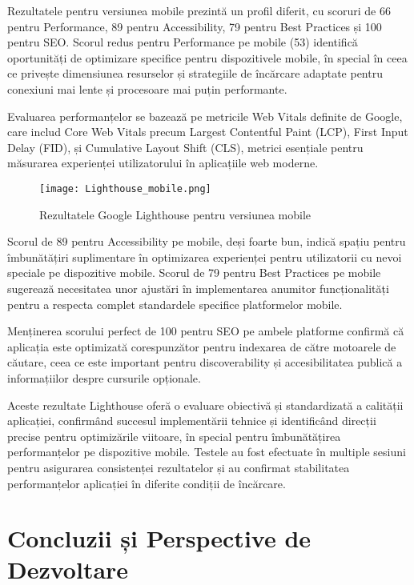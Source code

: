 \documentclass[12pt,a4paper]{report}
\begin{document}
Rezultatele pentru versiunea mobile prezintă un profil diferit, cu scoruri de 66 pentru Performance, 89 pentru Accessibility, 79 pentru Best Practices și 100 pentru SEO. Scorul redus pentru Performance pe mobile (53) identifică oportunități de optimizare specifice pentru dispozitivele mobile, în special în ceea ce privește dimensiunea resurselor și strategiile de încărcare adaptate pentru conexiuni mai lente și procesoare mai puțin performante.

Evaluarea performanțelor se bazează pe metricile Web Vitals \cite{web-vitals} definite de Google, care includ Core Web Vitals precum Largest Contentful Paint (LCP), First Input Delay (FID), și Cumulative Layout Shift (CLS), metrici esențiale pentru măsurarea experienței utilizatorului în aplicațiile web moderne.

\begin{figure}[H]
\centering
\texttt{[image: Lighthouse\_mobile.png]}
\caption{Rezultatele Google Lighthouse pentru versiunea mobile}
\label{fig:lighthouse-mobile}
\end{figure}

Scorul de 89 pentru Accessibility pe mobile, deși foarte bun, indică spațiu pentru îmbunătățiri suplimentare în optimizarea experienței pentru utilizatorii cu nevoi speciale pe dispozitive mobile. Scorul de 79 pentru Best Practices pe mobile sugerează necesitatea unor ajustări în implementarea anumitor funcționalități pentru a respecta complet standardele specifice platformelor mobile.

Menținerea scorului perfect de 100 pentru SEO pe ambele platforme confirmă că aplicația este optimizată corespunzător pentru indexarea de către motoarele de căutare, ceea ce este important pentru discoverability și accesibilitatea publică a informațiilor despre cursurile opționale.

Aceste rezultate Lighthouse oferă o evaluare obiectivă și standardizată a calității aplicației, confirmând succesul implementării tehnice și identificând direcții precise pentru optimizările viitoare, în special pentru îmbunătățirea performanțelor pe dispozitive mobile. Testele au fost efectuate în multiple sesiuni pentru asigurarea consistenței rezultatelor și au confirmat stabilitatea performanțelor aplicației în diferite condiții de încărcare.

\chapter{Concluzii și Perspective de Dezvoltare}
\end{document}
